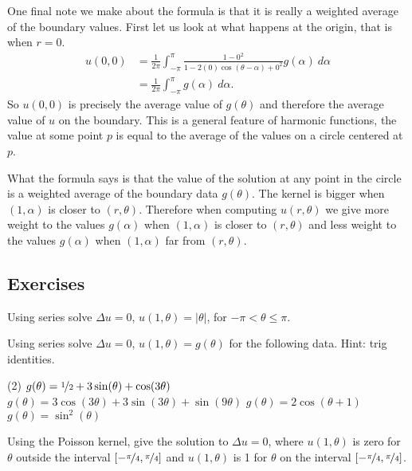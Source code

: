 One final note we make about the formula is that it is really
a weighted average of the boundary values.
First let us look
at what happens at the origin,
that is when $r=0$. %
\begin{equation*}
\begin{split}
u(0,0) &= 
\frac{1}{2\pi} \int_{-\pi}^{\pi}
\frac{1 -0^2}{1 - 2(0)\cos(\theta-\alpha) +0^2} g(\alpha) ~ d\alpha
\\
& =
\frac{1}{2\pi} \int_{-\pi}^{\pi}
g(\alpha) ~ d\alpha .
\end{split}
\end{equation*}
So $u(0,0)$ is precisely the average value of $g(\theta)$ and
therefore the average value of $u$ on the boundary.  This is
a general feature of harmonic functions, the value at some point $p$
is equal to the average of the values on a circle centered at $p$.

What the formula says is that the value of the solution at any point in the
circle is a weighted average of the boundary data $g(\theta)$.  The kernel
is bigger when $(1,\alpha)$ is closer to $(r,\theta)$.  Therefore when
computing $u(r,\theta)$ we
give more weight to the values $g(\alpha)$ when $(1,\alpha)$ is closer to $(r,\theta)$ and less
weight to the values $g(\alpha)$ when $(1,\alpha)$ far from $(r,\theta)$.

\subsection{Exercises}

\begin{exercise}
Using series solve
$\Delta u = 0$, $u(1,\theta) = \lvert \theta \rvert$, for $-\pi < \theta
\leq \pi$.
\end{exercise}

\begin{exercise}
Using series solve $\Delta u = 0$, $u(1,\theta) = g(\theta)$ for the
following data.  Hint: trig identities.
\begin{tasks}(2)
\task
$g(\theta) = 
\nicefrac{1}{2} + 3\sin(\theta) + \cos(3\theta)$
\task
$g(\theta) = 
3\cos(3\theta) + 3\sin(3\theta) + \sin(9\theta)$
\task
$g(\theta) = 2 \cos(\theta+1)$
\task
$g(\theta) = \sin^2(\theta)$
\end{tasks}
\end{exercise}

\begin{exercise}
Using the Poisson kernel, give the solution to
$\Delta u = 0$, where $u(1,\theta)$ is zero for $\theta$ outside
the interval $[-\nicefrac{\pi}{4},\nicefrac{\pi}{4}]$ and 
$u(1,\theta)$ is 1 for $\theta$ on the interval
$[-\nicefrac{\pi}{4},\nicefrac{\pi}{4}]$.
\end{exercise}

